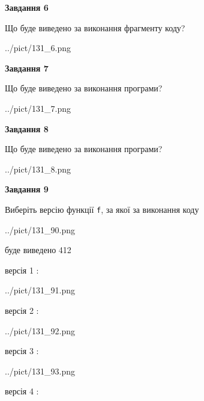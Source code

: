 \documentclass[12pt, ukrainian]{article}
\def\code#1{\Verb!#1!}
\begin{document}
{\begin {large}
{\begin {center}\textbf{Завдання 6}\end {center}}

Що буде виведено за виконання фрагменту коду?\par
\begin{center}
	{../pict/131_6.png}
\end{center}
\newpage

{\begin {center}\textbf{Завдання 7}\end {center}}

Що буде виведено за виконання програми?\par
\begin{center}
	{../pict/131_7.png}
\end{center}
\newpage

{\begin {center}\textbf{Завдання 8}\end {center}}

Що буде виведено за виконання програми?\par
\begin{center}
	{../pict/131_8.png}
\end{center}
\newpage

{\begin {center}\textbf{Завдання 9}\end {center}}

Виберіть версію функції \code{f}, за якої за виконання коду
\begin{center}
	{../pict/131_90.png}
\end{center}
буде виведено 412

\vspace{5mm}
версія 1 :

\begin{center}
	{../pict/131_91.png}
\end{center}
версія 2 :

\begin{center}
	{../pict/131_92.png}
\end{center}
версія 3 :

\begin{center}
	{../pict/131_93.png}
\end{center}
версія 4 :


\end{large}}
\end{document}
